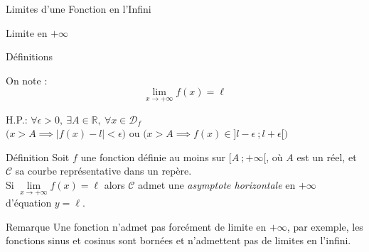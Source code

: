 \documentclass{cours}
\begin{document}
\begin{Gpartie}{Limites d'une Fonction en l'Infini}
\begin{Spartie}{Limite en $+\infty$}
\begin{SSpartie}{Définitions}
\begin{itemize}
                    On note : \[\boxed{\lim\limits_{x\to +\infty}f(x)=\ell}\]
                    \begin{center}
                        \parbox{\linewidth}{}
                    \end{center}
                    \vspace*{2ex}
                    H.P.: $\forall\epsilon >0,~\exists A\in\mathbb{R},~\forall x\in\mathcal{D}_f$ \\ \phantom{H.P.: }$\bigg(x>A\implies\left\lvert f(x)-l\right\rvert <\epsilon\bigg)$ ou $\bigg(x>A\implies f(x)\in\big]l-\epsilon~;l+\epsilon\big[\bigg)$
                \end{itemize}
            \end{SSpartie}
            \begin{SSpartie}{Définition} 
                Soit $f$ une fonction définie au moins sur $\big[A~;+\infty\big[$, où $A$ est un réel, et $\mathcal{C}$ sa courbe représentative dans un repère. \\ Si $\lim\limits_{x\to+\infty}f(x)=\ell$ alors $\mathcal{C}$ admet une \emph{asymptote horizontale} en $+\infty$ \\ d'équation $y=\ell$.
            \end{SSpartie}
            \begin{SSpartie}{Remarque} 
                Une fonction n'admet pas forcément de limite en $+\infty$, par exemple, les fonctions sinus et cosinus sont bornées et n'admettent pas de limites en l'infini.
            \end{SSpartie}
        \end{Spartie}

\end{Gpartie}
\end{document}
